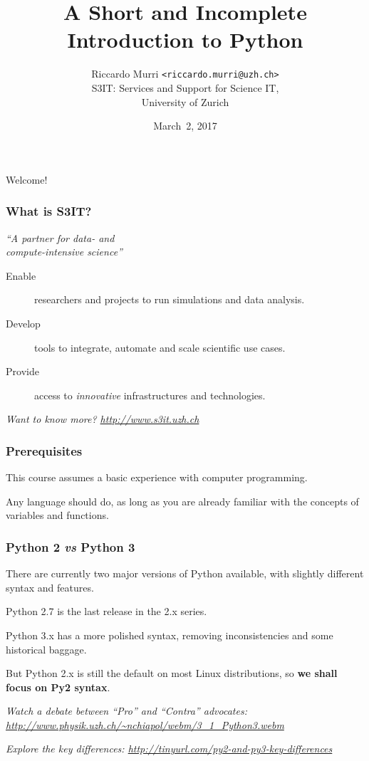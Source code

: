 \documentclass[english,serif,mathserif,xcolor=pdftex,dvipsnames,table]{beamer}
\title[Introduction to Python]{%
  A Short and Incomplete Introduction to Python
}
\author[S3IT]{%
  Riccardo Murri \texttt{<riccardo.murri@uzh.ch>}
  \\
  S3IT: Services and Support for Science IT,
  \\
  University of Zurich
}
\date{March~2, 2017}
\begin{document}
\maketitle

\begin{frame}
  \begin{center}
    {\Huge Welcome!}
  \end{center}
\end{frame}


\begin{frame}
  \frametitle{What is S3IT?}

  \begin{center}
    {\em ``A partner for data- and \\ compute-intensive science''}

    \+
    \begin{description}
    \item[Enable] researchers and projects to run simulations and data analysis.
    \item[Develop] tools to integrate, automate and scale scientific use cases.
    \item[Provide] access to {\em innovative} infrastructures and technologies.
    \end{description}

    \+
    {\em \small{Want to know more? }\url{http://www.s3it.uzh.ch}}
  \end{center}
\end{frame}


\begin{frame}
  \frametitle{Prerequisites}
  This course assumes a basic experience with computer programming.

  \+
  Any language should do, as long as you are already familiar with
  the concepts of variables and functions.
\end{frame}


\begin{frame}[fragile]
  \frametitle{Python 2 \emph{vs} Python 3}

  There are currently two major versions of Python available, with
  slightly different syntax and features.

  \+
  Python 2.7 is the last release in the 2.x series.

  \+
  Python 3.x has a more polished syntax, removing inconsistencies and
  some historical baggage.

  \+
  But Python 2.x is still the default on most Linux distributions, so
  \textbf{we shall focus on Py2 syntax}.

  \+
  {\footnotesize\em
    Watch a debate between ``Pro'' and ``Contra'' advocates:
    \url{http://www.physik.uzh.ch/~nchiapol/webm/3_1_Python3.webm}}

  \+
  {\footnotesize\em
    Explore the key differences:
    \url{http://tinyurl.com/py2-and-py3-key-differences}}
\end{frame}
\end{document}
